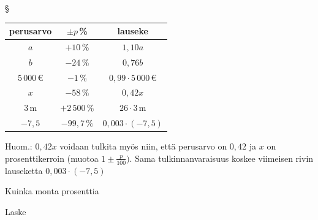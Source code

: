 \begin{tehtavasivu}
\begin{tehtava}
\begin{vastaus}
{§ \begin{tabular}{|c|c|c|}
\hline 
perusarvo & $\pm p$\,\% & lauseke \\ 
\hline 
$a$ & $+10$\,\% & $1,10a$ \\ 
\hline 
$b$ & $-24$\,\% &$0,76b$ \\ 
\hline 
$5\,000$\,€ & $-1\,\%$ &$0,99\cdot5\,000\,$€ \\ 
\hline 
$x$ &$-58\,\%$ & $0,42x$ \\ 
\hline 
 $3$\,m&$+2\,500\,\%$ &$26\cdot3$\,m \\ 
 \hline
 $-7,5$ & $-99,7\,\%$ & $0,003\cdot(-7,5)$ \\
  \hline %
\end{tabular}

Huom.: $0,42x$ voidaan tulkita myös niin, että perusarvo on $0,42$ ja $x$ on prosenttikerroin (muotoa $1\pm \frac{p}{100})$. Sama tulkinnanvaraisuus koskee viimeisen rivin lauseketta $0,003\cdot (-7,5)$
}
	\end{vastaus}
\end{tehtava}

\begin{tehtava}
    Kuinka monta prosenttia
    \begin{vastaus}
    \end{vastaus}
\end{tehtava}

\begin{tehtava}
    Laske
    \begin{vastaus}
    \end{vastaus}
\end{tehtava}


\end{tehtavasivu}
